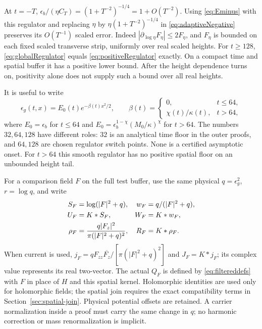 At $t=-T$,
$\epsilon_b/ (\eta C_T)=(1+T^{-2})^{-1/4}=1+O(T^{-2})$.
Using \eqref{eq:Eminus} with this regulator and replacing $\eta$ by
$\eta(1+T^{-2})^{-1/4}$ in \eqref{eq:adaptiveNegative} preserves its
$O(T^{-1})$ scaled error. Indeed
$|\partial_{\log\eta}F_\eta|\le2F_\eta$, and $F_\eta$ is bounded on
each fixed scaled transverse strip, uniformly over real scaled heights.
For $t\ge128$, \eqref{eq:globalRegulator} equals
\eqref{eq:positiveRegulator} exactly.
On a compact time and spatial buffer it has a positive lower bound.
After the height dependence turns on, positivity alone does not supply
such a bound over all real heights.


It is useful to write
\begin{equation}
 \epsilon_g(t,x)=E_0(t)e^{-\beta(t)x^2/2},\qquad
 \beta(t)=\begin{cases}0,&t\le64,\\\chi(t)/\kappa(t),&t>64,\end{cases}
 \label{eq:regulator-beta}
\end{equation}
where $E_0=\epsilon_b$ for $t\le64$ and
$E_0=\epsilon_b^{1-\chi}(M_0/\kappa)^\chi$ for $t>64$.
The numbers $32,64,128$ have different roles: $32$ is an analytical time
floor in the outer proofs, and $64,128$ are chosen regulator switch
points. None is a certified asymptotic onset. For $t>64$ this smooth
regulator has no positive spatial floor on an unbounded height tail.

For a comparison field $F$ on the full test buffer, use the
same physical $q=\epsilon_g^2$, $r=\log q$, and write
\begin{align}
 S_F&=\log(|F|^2+q),& w_F&=q/(|F|^2+q),\notag\\
 U_F&=K*S_F,&W_F&=K*w_F,\notag\\
 \rho_F&=\frac{q|F_z|^2}{\pi(|F|^2+q)^2},&R_F&=K*\rho_F.
 \label{eq:common-observables}
\end{align}
When current is used, $j_F=qF_{zz}\overline{F_z}/[\pi(|F|^2+q)^2]$
and $J_F=K*j_F$; its complex value represents its real two-vector.
The actual $Q_F$ is defined by \eqref{eq:filtereddefs} with $F$ in place
of $H$ and this spatial kernel. Holomorphic identities are used only for holomorphic fields; the spatial
join requires the exact compatibility terms in
Section~\ref{sec:spatial-join}. Physical potential offsets are retained.
A carrier normalization inside a proof must carry the same change in
$q$; no harmonic correction or mass renormalization is implicit.

